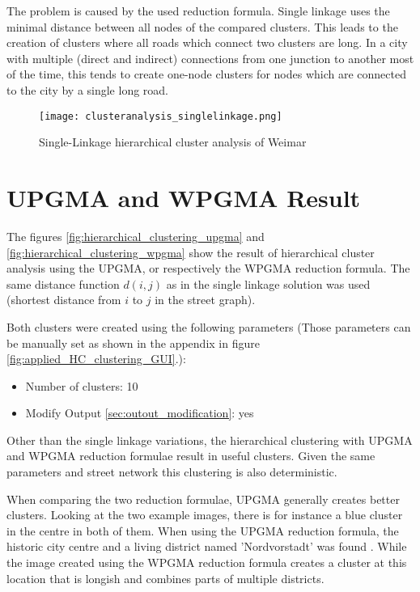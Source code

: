 The problem is caused by the used reduction formula. Single linkage uses the minimal distance between all nodes of the compared clusters. This leads to the creation of clusters where all roads which connect two clusters are long. In a city with multiple (direct and indirect) connections from one junction to another most of the time, this tends to create one-node clusters for nodes which are connected to the city by a single long road.

\begin{figure}
    \centering
    \begin{mdframed}[style=mdthight, userdefinedwidth=0.7\textwidth, align=center]
        \texttt{[image: clusteranalysis\_singlelinkage.png]}
    \end{mdframed}
    \caption{Single-Linkage hierarchical cluster analysis of Weimar\label{fig:SingleLinkage}}
\end{figure}

\pagebreak
\section{UPGMA and WPGMA Result}
\label{sec:UPGMAandWPGMA}
The figures \ref{fig:hierarchical_clustering_upgma} and \ref{fig:hierarchical_clustering_wpgma} show the result of hierarchical cluster analysis using the \acrshort{UPGMA}, or respectively the \acrshort{WPGMA} reduction formula. The same distance function $d(i, j)$ as in the single linkage solution was used (shortest distance from $i$ to $j$ in the street graph).

Both clusters were created using the following parameters (Those parameters can be manually set as shown in the appendix in figure \ref{fig:applied_HC_clustering_GUI}.):

\begin{itemize}
    \item Number of clusters: 10
    \item Modify Output \ref{sec:outout_modification}: yes
\end{itemize}

Other than the single linkage variations, the hierarchical clustering with \acrshort{UPGMA} and \acrshort{WPGMA} reduction formulae result in useful clusters. Given the same parameters and street network this clustering is also deterministic.

When comparing the two reduction formulae, \acrshort{UPGMA} generally creates better clusters. Looking at the two example images, there is for instance a blue cluster in the centre in both of them. When using the \acrshort{UPGMA} reduction formula, the historic city centre and a living district named 'Nordvorstadt' was found \cite{weimar.de}. While the image created using the \acrshort{WPGMA} reduction formula creates a cluster at this location that is longish and combines parts of multiple districts.

